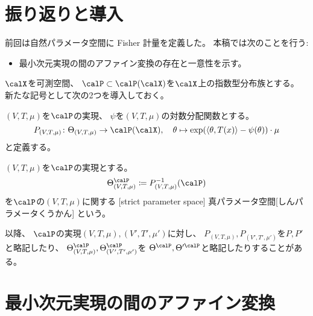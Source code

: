 \documentclass[report]{jlreq}
\begin{document}
%

%
\section*{振り返りと導入}

前回は自然パラメータ空間に Fisher 計量を定義した。
本稿では次のことを行う:
\begin{itemize}
    \item 最小次元実現の間のアファイン変換の存在と一意性を示す。
\end{itemize}

$\calX$を可測空間、
$\calP \subset \calP(\calX)$を$\calX$上の指数型分布族とする。
新たな記号として次の2つを導入しておく。

\begin{definition}
    $(V, T, \mu)$を$\calP$の実現、
    $\psi$を$(V, T, \mu)$の対数分配関数とする。
    \begin{equation}
        P_{(V, T, \mu)} \colon \Theta_{(V, T, \mu)} \to \calP(\calX),
            \quad
            \theta
            \mapsto
            \exp (\myangle{\theta}{T(x)} - \psi(\theta)) \cdot \mu
    \end{equation}
    と定義する。
\end{definition}

\begin{definition}[真パラメータ空間]
    $(V, T, \mu)$を$\calP$の実現とする。
    \begin{equation}
        \Theta^\calP_{(V, T, \mu)}
            \coloneqq P_{(V, T, \mu)}^{-1}(\calP)
    \end{equation}
    を$\calP$の$(V, T, \mu)$に関する
    [strict parameter space]
        {真パラメータ空間}[しんパラメータくうかん]
    という。
\end{definition}

以降、
$\calP$の実現$(V, T, \mu), (V', T', \mu')$に対し、
$P_{(V, T, \mu)}, P_{(V', T', \mu')}$を$P, P'$と略記したり、
$\Theta^\calP_{(V, T, \mu)}, \Theta^\calP_{(V', T', \mu')}$を
$\Theta^\calP, \Theta'^\calP$と略記したりすることがある。

%
\section{最小次元実現の間のアファイン変換}
\end{document}
